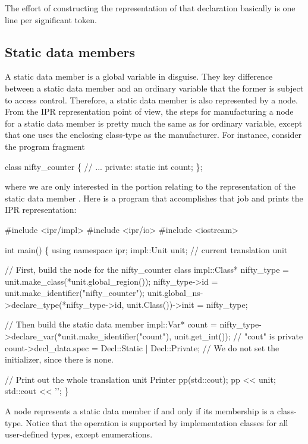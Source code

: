 \documentclass[11pt]{article}
\begin{document}
The effort of constructing the representation of that declaration basically is
one line per significant token. 


\subsection{Static data members}
\label{sec:named.data.static-member}

A static data member is a global variable in disguise.  They key difference
between a static data member and an ordinary variable that the former is
subject to access control.  Therefore, a static data member is also
represented by a  node.  From the IPR representation point of view,
the steps for manufacturing a node for a static data member is pretty much
the same as for ordinary variable, except that one uses the enclosing
class-type as the manufacturer.  For instance, consider the program fragment 
\begin{Program}
  class nifty_counter \{
    // ...
  private:
     static int count;
  \};
\end{Program}
where we are only interested in the portion relating to the representation of
the static data member .  Here is a program that
accomplishes that job and prints the IPR representation:
\begin{Program}
#include <ipr/impl>
#include <ipr/io>
#include <iostream>

int main()
\{
   using namespace ipr;
   impl::Unit unit;              // current translation unit

   // First, build the node for the nifty_counter class
   impl::Class* nifty_type = unit.make_class(*unit.global_region());
   nifty_type->id = unit.make_identifier("nifty_counter");
   unit.global_ns->declare_type(*nifty_type->id, unit.Class())->init
      = nifty_type;
   
   // Then build the static data member
   impl::Var* count = nifty_type->declare_var(*unit.make_identifier("count"),
                                              unit.get_int());
   // "cout" is private 
   count->decl_data.spec = Decl::Static | Decl::Private;
   // We do not set the initializer, since there is none.
   
   // Print out the whole translation unit
   Printer pp(std::cout);
   pp << unit;
   std::cout << '';
\}
\end{Program}

A  node represents a static data member if and only if its
membership is a class-type.  Notice that the operation 
is supported by implementation classes for all user-defined types, except
enumerations. 
\end{document}
